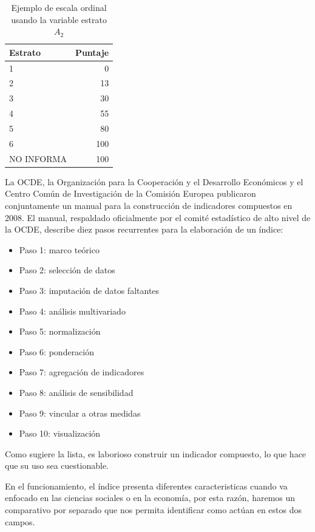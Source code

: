 \documentclass[
]{book}
\begin{document}
\begin{table}

\caption{\label{tab:estrato}Ejemplo de escala ordinal usando la variable estrato $A_2$}
\centering
\begin{tabular}[t]{l|r}
\hline
Estrato & Puntaje\\
\hline
1 & 0\\
\hline
2 & 13\\
\hline
3 & 30\\
\hline
4 & 55\\
\hline
5 & 80\\
\hline
6 & 100\\
\hline
NO INFORMA & 100\\
\hline
\end{tabular}
\end{table}

La OCDE, la Organización para la Cooperación y el Desarrollo Económicos \citep{BibEntry2020Dec} y el Centro Común de Investigación de la Comisión Europea \citep{BibEntry2015Jun} publicaron conjuntamente un manual para la construcción de indicadores compuestos en 2008. El manual, respaldado oficialmente por el comité estadístico de alto nivel de la OCDE, describe diez pasos recurrentes para la elaboración de un índice:

\begin{itemize}
\item
  Paso 1: marco teórico
\item
  Paso 2: selección de datos
\item
  Paso 3: imputación de datos faltantes
\item
  Paso 4: análisis multivariado
\item
  Paso 5: normalización
\item
  Paso 6: ponderación
\item
  Paso 7: agregación de indicadores
\item
  Paso 8: análisis de sensibilidad
\item
  Paso 9: vincular a otras medidas
\item
  Paso 10: visualización
\end{itemize}

Como sugiere la lista, es laborioso construir un indicador compuesto, lo que hace que su uso sea cuestionable.

En el funcionamiento, el índice presenta diferentes caracteristicas cuando va enfocado en las ciencias sociales o en la economía, por esta razón, haremos un comparativo por separado que nos permita identificar como actúan en estos dos campos.
\end{document}
